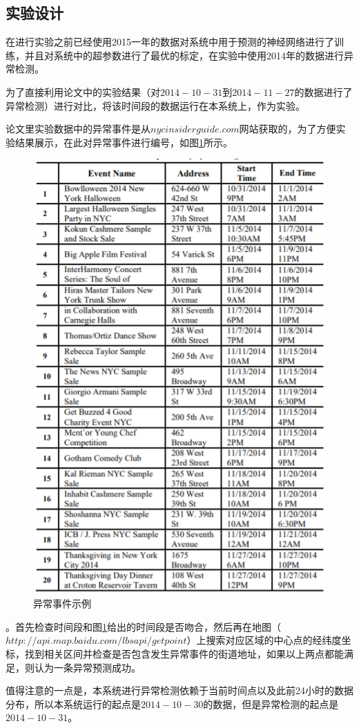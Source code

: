 \documentclass[a4paper, UTF8]{article}
\begin{document}
\begin{CJK}{UTF8}{gbsn}
\subsection{实验设计}
在进行实验之前已经使用2015一年的数据对系统中用于预测的神经网络进行了训练，并且对系统中的超参数进行了最优的标定，在实验中使用2014年的数据进行异常检测。
\par 为了直接利用论文中的实验结果（对$2014-10-31$到$2014-11-27$的数据进行了异常检测）进行对比，将该时间段的数据运行在本系统上，作为实验。
\par 论文里实验数据中的异常事件是从$nycinsiderguide.com$网站获取的，为了方便实验结果展示，在此对异常事件进行编号，如图\ref{anomaly}所示。
\begin{figure}[ht]
\includegraphics[scale = 1]{event.png}
\centering
\caption{异常事件示例}
\label{anomaly}
\end{figure}
。首先检查时间段和图\ref{anomaly}给出的时间段是否吻合，然后再在地图（$http://api.map.baidu.com/lbsapi/getpoint$）上搜索对应区域的中心点的经纬度坐标，找到相关区间并检查是否包含发生异常事件的街道地址，如果以上两点都能满足，则认为一条异常预测成功。
\par 值得注意的一点是，本系统进行异常检测依赖于当前时间点以及此前24小时的数据分布，所以本系统运行的起点是$2014-10-30$的数据，但是异常检测的起点是$2014-10-31$。

\end{CJK}
\end{document}
